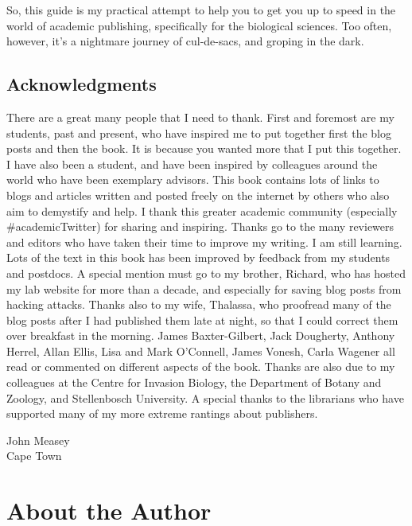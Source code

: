 \documentclass[
]{krantz}
\begin{document}
So, this guide is my practical attempt to help you to get you up to speed in the world of academic publishing, specifically for the biological sciences. Too often, however, it's a nightmare journey of cul-de-sacs, and groping in the dark.

\hypertarget{acknowledgments}{%
\section*{Acknowledgments}\label{acknowledgments}}


There are a great many people that I need to thank. First and foremost are my students, past and present, who have inspired me to put together first the blog posts and then the book. It is because you wanted more that I put this together. I have also been a student, and have been inspired by colleagues around the world who have been exemplary advisors. This book contains lots of links to blogs and articles written and posted freely on the internet by others who also aim to demystify and help. I thank this greater academic community (especially \#academicTwitter) for sharing and inspiring. Thanks go to the many reviewers and editors who have taken their time to improve my writing. I am still learning. Lots of the text in this book has been improved by feedback from my students and postdocs. A special mention must go to my brother, Richard, who has hosted my lab website for more than a decade, and especially for saving blog posts from hacking attacks. Thanks also to my wife, Thalassa, who proofread many of the blog posts after I had published them late at night, so that I could correct them over breakfast in the morning. James Baxter-Gilbert, Jack Dougherty, Anthony Herrel, Allan Ellis, Lisa and Mark O'Connell, James Vonesh, Carla Wagener all read or commented on different aspects of the book. Thanks are also due to my colleagues at the Centre for Invasion Biology, the Department of Botany and Zoology, and Stellenbosch University. A special thanks to the librarians who have supported many of my more extreme rantings about publishers.

\begin{flushright}
John Measey\\
Cape Town
\end{flushright}

\hypertarget{author}{%
\chapter*{About the Author}\label{author}}
\end{document}
